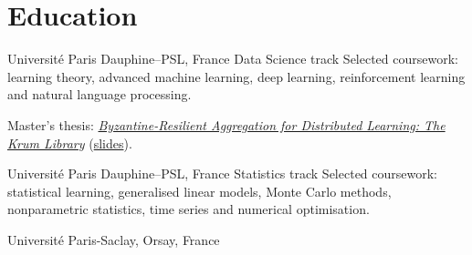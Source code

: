 \section{Education}

  {Universit\'e Paris Dauphine--PSL, France \textnormal{\textbar} Data Science track}
Selected coursework: learning theory, advanced machine learning, deep learning,
reinforcement learning and natural language processing.\par
Master's thesis: \href{https://links.arthurdanjou.fr/m2-report}{\emph{Byzantine-Resilient
Aggregation for Distributed Learning: The Krum Library}}
(\href{https://links.arthurdanjou.fr/m2-slides}{slides}).

  {Universit\'e Paris Dauphine--PSL, France \textnormal{\textbar} Statistics track}
Selected coursework: statistical learning, generalised linear models, Monte Carlo
methods, nonparametric statistics, time series and numerical optimisation.

  {Universit\'e Paris-Saclay, Orsay, France}
